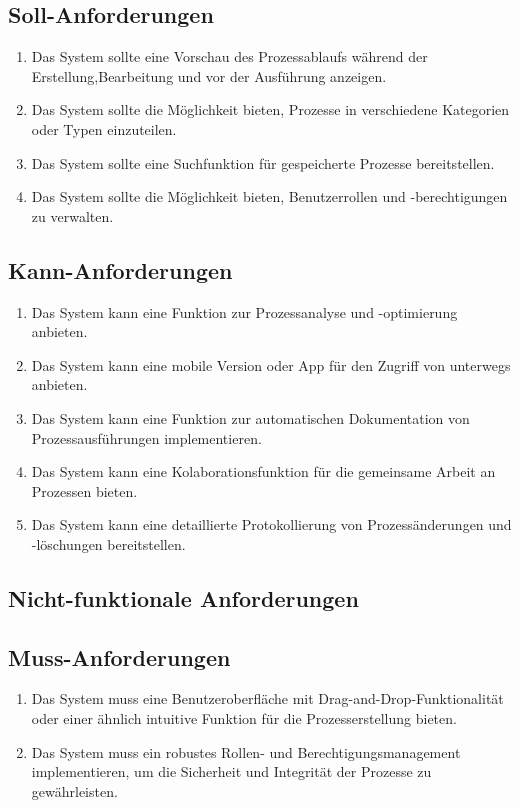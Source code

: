 \subsection*{Soll-Anforderungen}
\begin{enumerate}[label=\textbf{S\arabic*.}]
    \item Das System sollte eine Vorschau des Prozessablaufs während der Erstellung,Bearbeitung und vor der Ausführung anzeigen.
    \item Das System sollte die Möglichkeit bieten, Prozesse in verschiedene Kategorien oder Typen einzuteilen.
    \item Das System sollte eine Suchfunktion für gespeicherte Prozesse bereitstellen.
    \item Das System sollte die Möglichkeit bieten, Benutzerrollen und -berechtigungen zu verwalten.
\end{enumerate}
\subsection*{Kann-Anforderungen}
\begin{enumerate}[label=\textbf{K\arabic*.}]
    \item Das System kann eine Funktion zur Prozessanalyse und -optimierung anbieten.
    \item Das System kann eine mobile Version oder App für den Zugriff von unterwegs anbieten.
    \item Das System kann eine Funktion zur automatischen Dokumentation von Prozessausführungen implementieren.
    \item Das System kann eine Kolaborationsfunktion für die gemeinsame Arbeit an Prozessen bieten.
    \item Das System kann eine detaillierte Protokollierung von Prozessänderungen und -löschungen bereitstellen.
\end{enumerate}
\newpage
\subsection{Nicht-funktionale Anforderungen} \label{nf_Anforderungen}
\subsection*{Muss-Anforderungen}
\begin{enumerate}[label=\textbf{NM\arabic*.}]
    \item Das System muss eine Benutzeroberfläche mit Drag-and-Drop-Funktionalität oder einer ähnlich intuitive Funktion für die Prozesserstellung bieten.
    \item Das System muss ein robustes Rollen- und Berechtigungsmanagement implementieren, um die Sicherheit und Integrität der Prozesse zu gewährleisten.
\end{enumerate}
